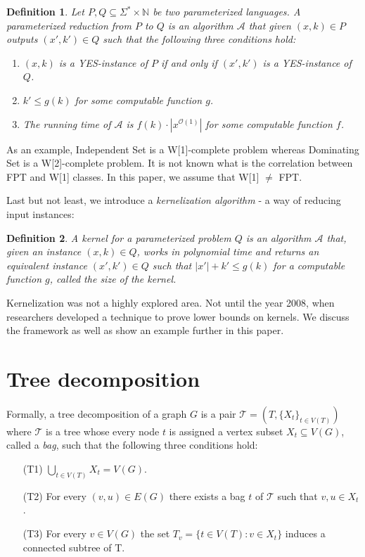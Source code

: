\documentclass[en]{pracamgr}
\newtheorem{definition}{Definition}
\newcommand{\domsetp}{{\sc Dominating Set}}
\newcommand{\indset}{{\sc Independent Set}}
\begin{document}
\begin{definition}
	Let $P,Q \subseteq \Sigma^* \times \mathbb{N}$ be two parameterized languages. A  \textup{parameterized reduction} from $P$ to $Q$ is an algorithm $\mathcal{A}$ that given $(x,k) \in P$ outputs $(x',k') \in Q$ such that the following three conditions hold:
	\begin{enumerate}
		\item $(x,k)$ is a YES-instance of $P$ if and only if $(x',k')$ is a YES-instance of $Q$.
		\item $k' \leq g(k)$ for some computable function $g$.
		\item The running time of $\mathcal{A}$ is $f(k) \cdot |x^{\mathcal{O}(1)}|$ for some computable function $f$.
	\end{enumerate}
\end{definition}

As an example, \indset{} is a W[1]-complete problem whereas \domsetp{} is a W[2]-complete problem. It is not known what is the correlation between FPT and W[1] classes. In this paper, we assume that W[1] $\neq$ FPT. 



Last but not least, we introduce a \emph{kernelization algorithm} - a way of reducing input instances:

\begin{definition}\label{Kernel}
	A \textup{kernel} for a parameterized problem $Q$ is an algorithm $\mathcal{A}$ that, given an instance $(x,k) \in Q$, works in polynomial time and returns an equivalent instance $(x',k') \in Q$
	such that $|x'| + k' \leq g(k)$ for a computable function $g$, called the \textup{size} of the kernel.
\end{definition}

Kernelization was not a highly explored area. Not until the year 2008, when researchers developed a technique to prove lower bounds on kernels. We discuss the framework as well as show an example further in this paper.

\section{Tree decomposition}

Formally, a tree decomposition of a graph $G$ is a pair $\mathcal{T} = (T, \{X_t\}_{t\in V(T)})$ where $\mathcal{T}$ is a tree whose every node $t$ is assigned a vertex subset $X_t \subseteq V(G)$, called a \emph{bag}, such that the following three conditions hold:
\begin{itemize}
	\item[(T1)] $\bigcup_{t\in V(T)}X_t = V(G)$.
	\item[(T2)] For every $(v,u) \in E(G)$ there exists a bag $t$ of $\mathcal{T}$ such that $v,u \in X_t$.
	\item[(T3)] For every $v \in V(G)$ the set $T_v = \{t \in V(T): v \in X_t\}$ induces a connected subtree of T.
\end{itemize}
\end{document}
